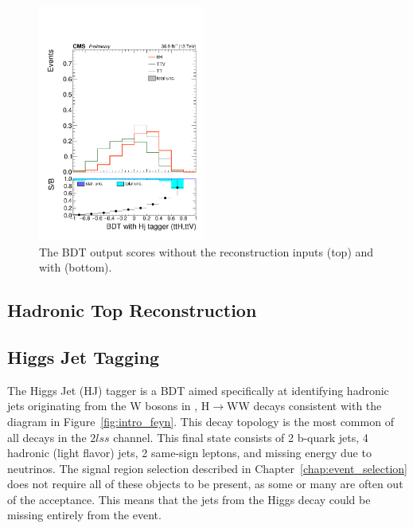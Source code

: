\begin{figure}[htp]
\includegraphics[width=0.49\textwidth]{ch9_figs/kinMVA_2lss_ttV_withHj.pdf}
\caption[BDT output scores with and without reconstruction inputs]{The BDT output scores without the reconstruction inputs (top) and with (bottom).}
\label{fig:inputs3}
\end{figure}

\subsection{Hadronic Top Reconstruction}

\subsection{Higgs Jet Tagging}
The Higgs Jet (HJ) tagger is a BDT aimed specifically at identifying hadronic jets originating from the W bosons in \tth, H$\rightarrow$WW decays consistent
with the \tth diagram in Figure~\ref{fig:intro_feyn}. This decay topology is the most common of all \tth decays in the $2lss$ channel. This final state
consists of 2 b-quark jets, 4 hadronic (light flavor) jets, 2 same-sign leptons, and missing energy due to neutrinos. The signal region selection described
in Chapter~\ref{chap:event_selection} does not require all of these objects to be present, as some or many are often out of the acceptance. This means that
the jets from the Higgs decay could be missing entirely from the event.

